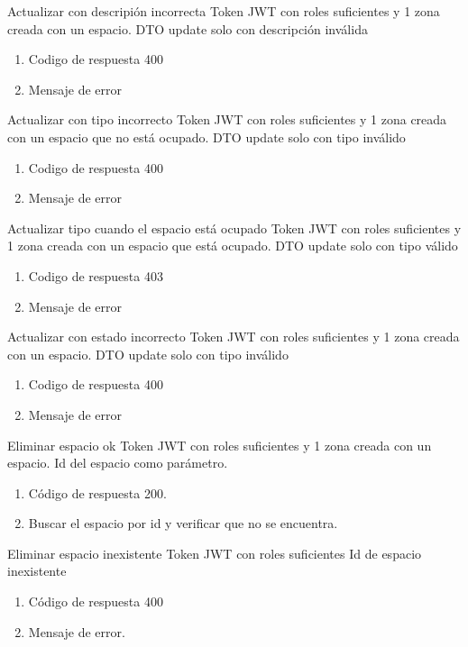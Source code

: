 {Actualizar con descripión incorrecta}
{Token JWT con roles suficientes y 1 zona creada con un espacio.}
{DTO update solo con descripción inválida}
{\begin{enumerate} [leftmargin=*, nosep]
    \item Codigo de respuesta 400
    \item Mensaje de error
\end{enumerate}}

{Actualizar con tipo incorrecto}
{Token JWT con roles suficientes y 1 zona creada con un espacio que no está ocupado.}
{DTO update solo con tipo inválido}
{\begin{enumerate} [leftmargin=*, nosep]
    \item Codigo de respuesta 400
    \item Mensaje de error
\end{enumerate}}

{Actualizar tipo cuando el espacio está ocupado}
{Token JWT con roles suficientes y 1 zona creada con un espacio que está ocupado.}
{DTO update solo con tipo válido}
{\begin{enumerate} [leftmargin=*, nosep]
    \item Codigo de respuesta 403
    \item Mensaje de error
\end{enumerate}}

{Actualizar con estado incorrecto}
{Token JWT con roles suficientes y 1 zona creada con un espacio.}
{DTO update solo con tipo inválido}
{\begin{enumerate} [leftmargin=*, nosep]
    \item Codigo de respuesta 400
    \item Mensaje de error
\end{enumerate}}

{Eliminar espacio ok}
{Token JWT con roles suficientes y 1 zona creada con un espacio.}
{Id del espacio como parámetro.}
{\begin{enumerate} [leftmargin=*, nosep]
    \item Código de respuesta 200.
    \item Buscar el espacio por id y verificar que no se encuentra.
\end{enumerate}}

{Eliminar espacio inexistente}
{Token JWT con roles suficientes}
{Id de espacio inexistente}
{\begin{enumerate} [leftmargin=*, nosep]
    \item Código de respuesta 400
    \item Mensaje de error.
\end{enumerate}}

